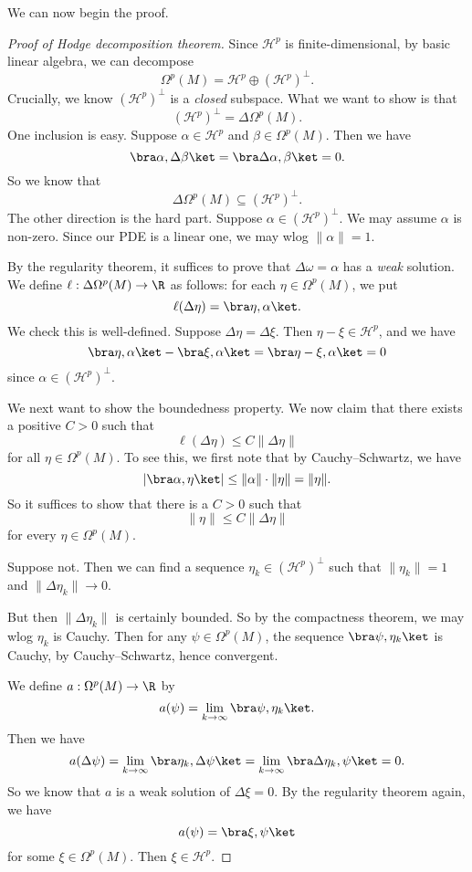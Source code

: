\documentclass[a4paper]{article}
\begin{document}
We can now begin the proof.
\begin{proof}[Proof of Hodge decomposition theorem]
  Since $\mathcal{H}^p$ is finite-dimensional, by basic linear algebra, we can decompose
  \[
    \Omega^p(M) = \mathcal{H}^p \oplus (\mathcal{H}^p)^\perp.
  \]
  Crucially, we know $(\mathcal{H}^p)^\perp$ is a \emph{closed} subspace. What we want to show is that
  \[
    (\mathcal{H}^p)^\perp = \Delta \Omega^p(M).
  \]
  One inclusion is easy. Suppose $\alpha \in \mathcal{H}^p$ and $\beta \in \Omega^p(M)$. Then we have
  \[
    \bra \alpha, \Delta \beta\ket = \bra \Delta \alpha, \beta\ket = 0.
  \]
  So we know that
  \[
    \Delta \Omega^p(M) \subseteq (\mathcal{H}^p)^\perp.
  \]
  The other direction is the hard part. Suppose $\alpha \in (\mathcal{H}^p)^\perp$. We may assume $\alpha$ is non-zero. Since our PDE is a linear one, we may wlog $\|\alpha\| = 1$.

  By the regularity theorem, it suffices to prove that $\Delta \omega = \alpha$ has a \emph{weak} solution. We define $\ell: \Delta \Omega^p(M) \to \R$ as follows: for each $\eta \in \Omega^p(M)$, we put
  \[
    \ell (\Delta \eta) = \bra \eta, \alpha\ket.
  \]
  We check this is well-defined. Suppose $\Delta \eta = \Delta \xi$. Then $\eta - \xi \in \mathcal{H}^p$, and we have
  \[
    \bra \eta, \alpha\ket - \bra \xi, \alpha\ket = \bra \eta - \xi, \alpha \ket = 0
  \]
  since $\alpha \in (\mathcal{H}^p)^\perp$.

  We next want to show the boundedness property. We now claim that there exists a positive $C > 0$ such that
  \[
    \ell(\Delta \eta)\leq C \|\Delta \eta\|
  \]
  for all $\eta \in \Omega^p(M)$. To see this, we first note that by Cauchy--Schwartz, we have
  \[
    |\bra \alpha, \eta\ket| \leq \|\alpha\| \cdot \|\eta\| = \|\eta\|.
  \]
  So it suffices to show that there is a $C > 0$ such that
  \[
    \|\eta\| \leq C\|\Delta \eta\|
  \]
  for every $\eta \in \Omega^p(M)$.
  
  Suppose not. Then we can find a sequence $\eta_k \in (\mathcal{H}^p)^{\perp}$ such that $\|\eta_k\| = 1$ and $\|\Delta \eta_k\| \to 0$.

  But then $\|\Delta \eta_k\|$ is certainly bounded. So by the compactness theorem, we may wlog $\eta_k$ is Cauchy. Then for any $\psi \in \Omega^p(M)$, the sequence $\bra \psi, \eta_k\ket$ is Cauchy, by Cauchy--Schwartz, hence convergent.

  We define $a: \Omega^p(M) \to \R$ by
  \[
    a(\psi) = \lim_{k \to \infty} \bra \psi, \eta_k\ket.
  \]
  Then we have
  \[
    a(\Delta \psi) = \lim_{k \to \infty} \bra \eta_k, \Delta \psi\ket = \lim_{k \to \infty} \bra \Delta \eta_k, \psi\ket = 0.
  \]
  So we know that $a$ is a weak solution of $\Delta \xi = 0$. By the regularity theorem again, we have
  \[
    a(\psi) = \bra \xi, \psi\ket
  \]
  for some $\xi \in \Omega^p(M)$. Then $\xi \in \mathcal{H}^p$.


\end{proof}
\end{document}
